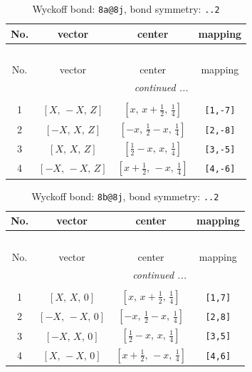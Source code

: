 \documentclass[fleqn,8pt]{jsarticle}
\begin{document}
\begin{longtable}{cccc}
\caption{Wyckoff bond: {\tt 8a@8j}, bond symmetry: {\tt ..2}}
 \\
 \hline \hline
No. & vector & center & mapping \\ \hline \endfirsthead

\multicolumn{3}{l}{\tablename\ \thetable{}} \\
 \hline \hline
No. & vector & center & mapping \\ \hline \endhead

 \hline \hline
\multicolumn{3}{r}{\footnotesize\it continued ...} \\ \endfoot

 \hline \hline
\multicolumn{3}{r}{} \\ \endlastfoot

1 & $\left[ X,\, - X,\, Z \right]$ & $\left[ x,\, x + \frac{1}{2},\, \frac{1}{4} \right]$ & {\tt [1,-7]} \\ \hline
2 & $\left[ - X,\, X,\, Z \right]$ & $\left[ - x,\, \frac{1}{2} - x,\, \frac{1}{4} \right]$ & {\tt [2,-8]} \\ \hline
3 & $\left[ X,\, X,\, Z \right]$ & $\left[ \frac{1}{2} - x,\, x,\, \frac{1}{4} \right]$ & {\tt [3,-5]} \\ \hline
4 & $\left[ - X,\, - X,\, Z \right]$ & $\left[ x + \frac{1}{2},\, - x,\, \frac{1}{4} \right]$ & {\tt [4,-6]} \\
\end{longtable}
\renewcommand{\arraystretch}{1.2}
\begin{longtable}{cccc}
\caption{Wyckoff bond: {\tt 8b@8j}, bond symmetry: {\tt ..2}}
 \\
 \hline \hline
No. & vector & center & mapping \\ \hline \endfirsthead

\multicolumn{3}{l}{\tablename\ \thetable{}} \\
 \hline \hline
No. & vector & center & mapping \\ \hline \endhead

 \hline \hline
\multicolumn{3}{r}{\footnotesize\it continued ...} \\ \endfoot

 \hline \hline
\multicolumn{3}{r}{} \\ \endlastfoot

1 & $\left[ X,\, X,\, 0 \right]$ & $\left[ x,\, x + \frac{1}{2},\, \frac{1}{4} \right]$ & {\tt [1,7]} \\ \hline
2 & $\left[ - X,\, - X,\, 0 \right]$ & $\left[ - x,\, \frac{1}{2} - x,\, \frac{1}{4} \right]$ & {\tt [2,8]} \\ \hline
3 & $\left[ - X,\, X,\, 0 \right]$ & $\left[ \frac{1}{2} - x,\, x,\, \frac{1}{4} \right]$ & {\tt [3,5]} \\ \hline
4 & $\left[ X,\, - X,\, 0 \right]$ & $\left[ x + \frac{1}{2},\, - x,\, \frac{1}{4} \right]$ & {\tt [4,6]} \\
\end{longtable}
\end{document}
